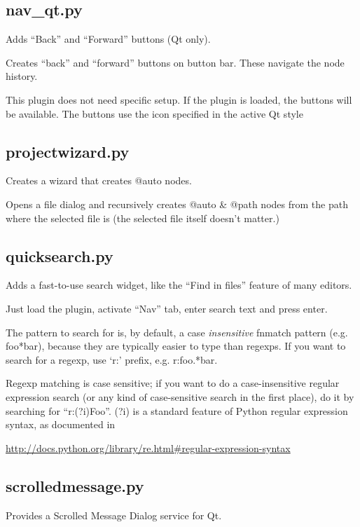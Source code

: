 \documentclass[a4paper,10pt,english]{sphinxmanual}
\begin{document}
\subsection{nav\_qt.py}
\label{plugins:nav-qt-py}
Adds ``Back'' and ``Forward'' buttons (Qt only).

Creates ``back'' and ``forward'' buttons on button bar. These navigate
the node history.

This plugin does not need specific setup. If the plugin is loaded, the buttons
will be available. The buttons use the icon specified in the active Qt style


\subsection{projectwizard.py}
\label{plugins:projectwizard-py}
Creates a wizard that creates @auto nodes.

Opens a file dialog and recursively creates @auto \& @path nodes from the path
where the selected file is (the selected file itself doesn't matter.)


\subsection{quicksearch.py}
\label{plugins:quicksearch-py}
Adds a fast-to-use search widget, like the ``Find in files'' feature of many editors.

Just load the plugin, activate ``Nav'' tab, enter search text and press enter.

The pattern to search for is, by default, a case \emph{insensitive} fnmatch pattern
(e.g. foo*bar), because they are typically easier to type than regexps. If you
want to search for a regexp, use `r:' prefix, e.g. r:foo.*bar.

Regexp matching is case sensitive; if you want to do a case-insensitive regular
expression search (or any kind of case-sensitive search in the first place), do it
by searching for ``r:(?i)Foo''. (?i) is a standard feature of Python regular expression
syntax, as documented in

\href{http://docs.python.org/library/re.html\#regular-expression-syntax}{http://docs.python.org/library/re.html\#regular-expression-syntax}


\subsection{scrolledmessage.py}
\label{plugins:scrolledmessage-py}
Provides a Scrolled Message Dialog service for Qt.
\end{document}
